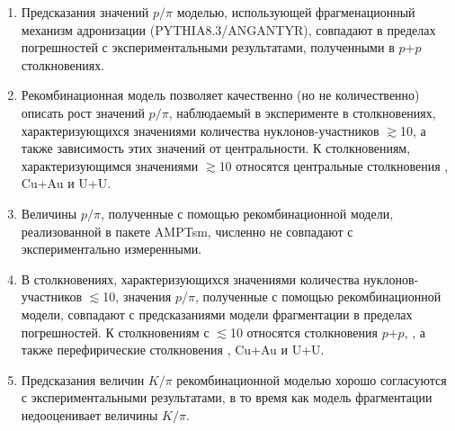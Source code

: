 \begin{enumerate}
	\item Предсказания значений $p/\pi$ моделью, использующей фрагменационный механизм адронизации (PYTHIA8.3/ANGANTYR), совпадают в пределах погрешностей с экспериментальными результатами, полученными в $p$+$p$ столкновениях. 
	\item Рекомбинационная модель позволяет качественно (но не количественно) описать рост значений $p/\pi$, наблюдаемый в эксперименте в столкновениях, характеризующихся значениями количества нуклонов-участников \Npart $\gtrsim$10, а также зависимость этих значений от центральности. К столкновениям, характеризующимся значениями \Npart $\gtrsim$10 относятся центральные столкновения \heau, Cu+Au и U+U.
	\item Величины $p/\pi$, полученные с помощью рекомбинационной модели, реализованной в пакете AMPTsm, численно не совпадают с экспериментально измеренными. 
	\item В столкновениях, характеризующихся значениями количества нуклонов-участников \Npart $\lesssim$10, значения $p/\pi$, полученные с помощью рекомбинационной модели, совпадают с предсказаниями модели фрагментации в пределах погрешностей. К столкновениям с \Npart $\lesssim$10 относятся столкновения $p$+$p$, \pal, а также перефирические столкновения \heau, Cu+Au и U+U.
	\item Предсказания величин $K/\pi$ рекомбинационной моделью хорошо согласуются с экспериментальными результатами, в то время как модель фрагментации недооценивает величины $K/\pi$.
\end{enumerate}


